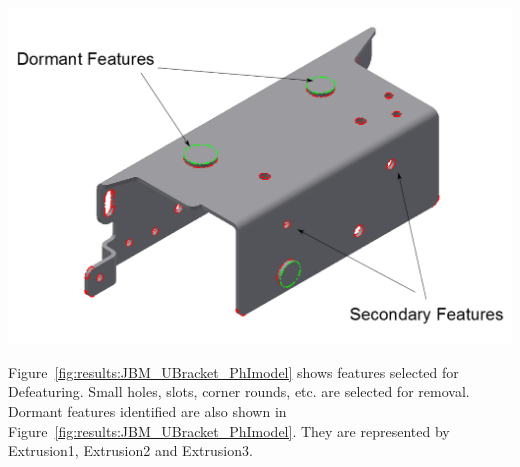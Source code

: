 \begin{minipage}{\linewidth}
\begin{minipage}[c]{0.62\linewidth}
\includegraphics[width=\linewidth,valign=t]{images/JBM_UBracket_PhI_model}
 \label{fig:results:JBM_UBracket_PhImodel}


Figure~\ref{fig:results:JBM_UBracket_PhImodel} shows features selected for Defeaturing. Small holes, slots, corner rounds, etc. are selected for removal. Dormant features identified are also shown in  Figure~\ref{fig:results:JBM_UBracket_PhImodel}. They are represented by Extrusion1, Extrusion2 and Extrusion3.



\end{minipage}
\end{minipage}
